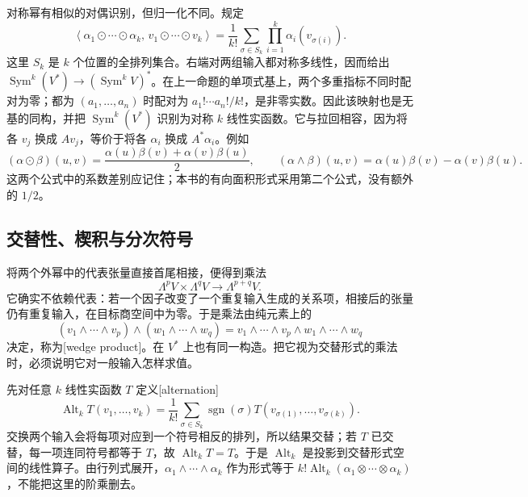 \ProseParagraphBreak

对称幂有相似的对偶识别，但归一化不同。规定
\[
	\left\langle\alpha_1\odot\cdots\odot\alpha_k,\,
	v_1\odot\cdots\odot v_k\right\rangle
	=\frac1{k!}\sum_{\sigma\in S_k}\prod_{i=1}^k\alpha_i(v_{\sigma(i)}).
\]
这里 \(S_k\) 是 \(k\) 个位置的全排列集合。右端对两组输入都对称多线性，因而给出 \(\operatorname{Sym}^k(V^*)\to(\operatorname{Sym}^kV)^*\)。在上一命题的单项式基上，两个多重指标不同时配对为零；都为 \((a_1,\ldots,a_n)\) 时配对为 \(a_1!\cdots a_n!/k!\)，是非零实数。因此该映射也是无基的同构，并把 \(\operatorname{Sym}^k(V^*)\) 识别为对称 \(k\) 线性实函数。它与拉回相容，因为将各 \(v_j\) 换成 \(Av_j\)，等价于将各 \(\alpha_i\) 换成 \(A^*\alpha_i\)。例如
\[
	(\alpha\odot\beta)(u,v)=\frac{\alpha(u)\beta(v)+\alpha(v)\beta(u)}2,\qquad
	(\alpha\wedge\beta)(u,v)=\alpha(u)\beta(v)-\alpha(v)\beta(u).
\]
这两个公式中的系数差别应记住；本书的有向面积形式采用第二个公式，没有额外的 \(1/2\)。

\subsection{交替性、楔积与分次符号}
\label{g1:subsec:1202:03}

将两个外幂中的代表张量直接首尾相接，便得到乘法
\[
	\Lambda^pV\times\Lambda^qV\longrightarrow\Lambda^{p+q}V.
\]
它确实不依赖代表：若一个因子改变了一个重复输入生成的关系项，相接后的张量仍有重复输入，在目标商空间中为零。于是乘法由纯元素上的
\[
	(v_1\wedge\cdots\wedge v_p)\wedge(w_1\wedge\cdots\wedge w_q)
	=v_1\wedge\cdots\wedge v_p\wedge w_1\wedge\cdots\wedge w_q
\]
决定，称为[wedge product]。在 \(V^*\) 上也有同一构造。把它视为交替形式的乘法时，必须说明它对一般输入怎样求值。

\ProseParagraphBreak

先对任意 \(k\) 线性实函数 \(T\) 定义[alternation]
\[
	\operatorname{Alt}_kT(v_1,\ldots,v_k)
	=\frac1{k!}\sum_{\sigma\in S_k}\operatorname{sgn}(\sigma)
	T(v_{\sigma(1)},\ldots,v_{\sigma(k)}).
\]
交换两个输入会将每项对应到一个符号相反的排列，所以结果交替；若 \(T\) 已交替，每一项连同符号都等于 \(T\)，故 \(\operatorname{Alt}_kT=T\)。于是 \(\operatorname{Alt}_k\) 是投影到交替形式空间的线性算子。由行列式展开，\(\alpha_1\wedge\cdots\wedge\alpha_k\) 作为形式等于 \(k!\operatorname{Alt}_k(\alpha_1\otimes\cdots\otimes\alpha_k)\)，不能把这里的阶乘删去。

